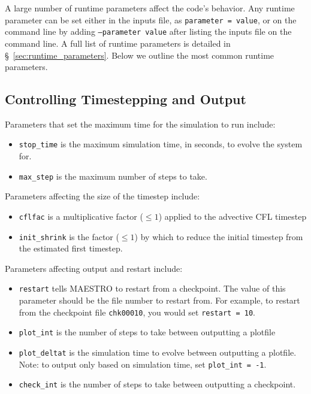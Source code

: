A large number of runtime parameters affect the code's behavior.  Any
runtime parameter can be set either in the inputs file, as {\tt parameter
  = value}, or on the command line by adding {\tt --parameter value} after
listing the inputs file on the command line.  A full list of runtime
parameters is detailed in \S~\ref{sec:runtime_parameters}.  Below we
outline the most common runtime parameters.

\subsection{Controlling Timestepping and Output}

Parameters that set the maximum time for the simulation to run
include:
\begin{itemize}
\item {\tt stop\_time} is the maximum simulation time, in seconds,
      to evolve the system for.

\item {\tt max\_step} is the maximum number of steps to take.
\end{itemize}

\noindent Parameters affecting the size of the timestep include:
\begin{itemize}
\item {\tt cflfac} is a multiplicative factor ({\tt $\le 1$}) 
      applied to the advective CFL timestep

\item {\tt init\_shrink} is the factor ({\tt $\le 1$}) by which to reduce 
      the initial timestep from the estimated first timestep.
\end{itemize}

\noindent Parameters affecting output and restart include:
\begin{itemize}

\item {\tt restart} tells MAESTRO to restart from a checkpoint.  The
      value of this parameter should be the file number to restart from.
      For example, to restart from the checkpoint file {\tt chk00010},
      you would set {\tt restart = 10}.

\item {\tt plot\_int} is the number of steps to take between
  outputting a plotfile

\item {\tt plot\_deltat} is the simulation time to evolve between
  outputting a plotfile.  Note: to output only based on simulation
  time, set {\tt plot\_int = -1}.

\item {\tt check\_int} is the number of steps to take between
  outputting a checkpoint.

\end{itemize}

